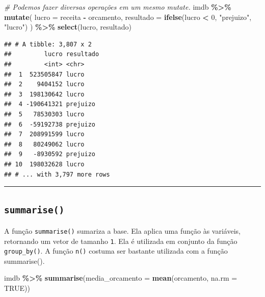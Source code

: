 \documentclass[
]{book}
\newenvironment{Shaded}{\begin{snugshade}}{\end{snugshade}}
\newcommand{\CommentTok}[1]{\textcolor[rgb]{0.56,0.35,0.01}{\textit{#1}}}
\newcommand{\DataTypeTok}[1]{\textcolor[rgb]{0.13,0.29,0.53}{#1}}
\newcommand{\DecValTok}[1]{\textcolor[rgb]{0.00,0.00,0.81}{#1}}
\newcommand{\KeywordTok}[1]{\textcolor[rgb]{0.13,0.29,0.53}{\textbf{#1}}}
\newcommand{\NormalTok}[1]{#1}
\newcommand{\OperatorTok}[1]{\textcolor[rgb]{0.81,0.36,0.00}{\textbf{#1}}}
\newcommand{\OtherTok}[1]{\textcolor[rgb]{0.56,0.35,0.01}{#1}}
\newcommand{\StringTok}[1]{\textcolor[rgb]{0.31,0.60,0.02}{#1}}
\begin{document}
\begin{Shaded}
\begin{Highlighting}[]
\CommentTok{\# Podemos fazer diversas operações em um mesmo mutate.}
\NormalTok{imdb }\OperatorTok{\%>\%}
\StringTok{  }\KeywordTok{mutate}\NormalTok{(}
    \DataTypeTok{lucro =}\NormalTok{ receita }\OperatorTok{{-}}\StringTok{ }\NormalTok{orcamento,}
    \DataTypeTok{resultado =} \KeywordTok{ifelse}\NormalTok{(lucro }\OperatorTok{<}\StringTok{ }\DecValTok{0}\NormalTok{, }\StringTok{"prejuizo"}\NormalTok{, }\StringTok{"lucro"}\NormalTok{)}
\NormalTok{  ) }\OperatorTok{\%>\%}
\StringTok{  }\KeywordTok{select}\NormalTok{(lucro, resultado)}
\end{Highlighting}
\end{Shaded}

\begin{verbatim}
## # A tibble: 3,807 x 2
##         lucro resultado
##         <int> <chr>    
##  1  523505847 lucro    
##  2    9404152 lucro    
##  3  198130642 lucro    
##  4 -190641321 prejuizo 
##  5   78530303 lucro    
##  6  -59192738 prejuizo 
##  7  208991599 lucro    
##  8   80249062 lucro    
##  9   -8930592 prejuizo 
## 10  198032628 lucro    
## # ... with 3,797 more rows
\end{verbatim}

\begin{center}\rule{0.5\linewidth}{0.5pt}\end{center}

\hypertarget{summarise}{%
\subsection{\texorpdfstring{\texttt{summarise()}}{summarise()}}\label{summarise}}

A função \texttt{summarise()} sumariza a base. Ela aplica uma função às variáveis, retornando um vetor de tamanho \texttt{1}. Ela é utilizada em conjunto da função \texttt{group\_by()}. A função \texttt{n()} costuma ser bastante utilizada com a função summarise().

\begin{Shaded}
\begin{Highlighting}[]
\NormalTok{imdb }\OperatorTok{\%>\%}
\StringTok{  }\KeywordTok{summarise}\NormalTok{(}\DataTypeTok{media\_orcamento =} \KeywordTok{mean}\NormalTok{(orcamento, }\DataTypeTok{na.rm =} \OtherTok{TRUE}\NormalTok{))}
\end{Highlighting}
\end{Shaded}
\end{document}

